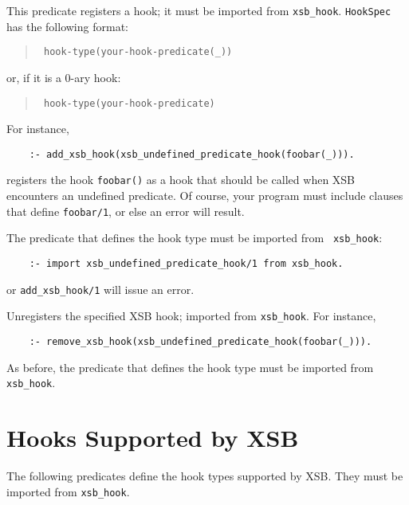 \begin{description}
  

This predicate registers a hook; it must be imported from {\tt xsb\_hook}.
{\tt HookSpec} has the following format:
\begin{quote}
 {\tt
   hook-type(your-hook-predicate(\_))
   }
\end{quote}
or, if it is a 0-ary hook:
\begin{quote}
  {\tt
   hook-type(your-hook-predicate)
   }  
\end{quote}
For instance, 
\begin{verbatim}
    :- add_xsb_hook(xsb_undefined_predicate_hook(foobar(_))).
\end{verbatim}
registers the hook {\tt foobar()} as a hook that should be called when XSB
encounters an undefined predicate. Of course, your program must include
clauses that define {\tt foobar/1}, or else an error will result.

The predicate that defines the hook type must be imported from {\tt
  xsb\_hook}:
\begin{verbatim}
    :- import xsb_undefined_predicate_hook/1 from xsb_hook.  
\end{verbatim}
or {\tt add\_xsb\_hook/1} will issue an error.

 

Unregisters the specified XSB hook; imported from {\tt xsb\_hook}. For
instance,
\begin{verbatim}
    :- remove_xsb_hook(xsb_undefined_predicate_hook(foobar(_))).
\end{verbatim}
As before, the predicate that defines the hook type must be imported from
{\tt xsb\_hook}.
\end{description}


\section{Hooks Supported by XSB}

The following predicates define the hook types supported by XSB. They must
be imported from {\tt xsb\_hook}.

